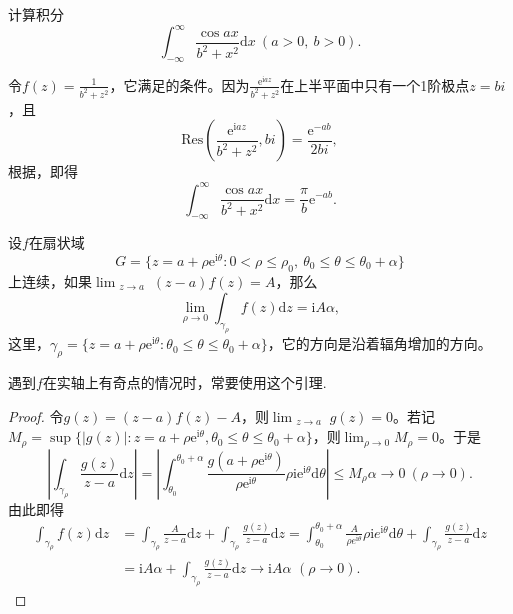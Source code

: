 \documentclass[../../main.tex]{subfiles}
\begin{document}
\begin{example}
计算积分
\[
\int_{-\infty}^{\infty} \frac{\cos ax}{b^2 + x^2} \mathrm{d}x \ (a > 0, \ b > 0).
\]
\end{example}
\begin{solution}
令\( f(z) = \frac{1}{b^2 + z^2} \)，它满足的条件。因为\( \frac{\mathrm{e}^{\mathrm{i}az}}{b^2 + z^2} \)在上半平面中只有一个1阶极点\( z = bi \)，且
\[
\mathrm{Res}\left( \frac{\mathrm{e}^{\mathrm{i}az}}{b^2 + z^2}, bi \right) = \frac{\mathrm{e}^{-ab}}{2bi},
\]
根据，即得
\[
\int_{-\infty}^{\infty} \frac{\cos ax}{b^2 + x^2} \mathrm{d}x = \frac{\pi}{b} \mathrm{e}^{-ab}.
\]

\end{solution}

\begin{lemma}\label{lemma:引理5.5.9}
设$f$在扇状域
\[
G = \{ z = a + \rho \mathrm{e}^{\mathrm{i}\theta} : 0 < \rho \leqslant \rho_0, \ \theta_0 \leqslant \theta \leqslant \theta_0 + \alpha \}
\]
上连续，如果\(\lim_{\substack{z \to a}} (z - a)f(z) = A\)，那么
\[
\lim_{\rho \to 0} \int_{\gamma_{\rho}} f(z) \mathrm{d}z = \mathrm{i}A\alpha, \label{lem5.5.9_eq}
\]
这里，\(\gamma_{\rho} = \{ z = a + \rho \mathrm{e}^{\mathrm{i}\theta} : \theta_0 \leqslant \theta \leqslant \theta_0 + \alpha \}\)，它的方向是沿着辐角增加的方向。
\end{lemma}
\begin{remark}
遇到$f$在实轴上有奇点的情况时，常要使用这个引理.
\end{remark}
\begin{proof}
令\( g(z) = (z - a)f(z) - A \)，则\(\lim_{\substack{z \to a}} g(z) = 0\)。若记\( M_{\rho} = \sup\{ |g(z)| : z = a + \rho \mathrm{e}^{\mathrm{i}\theta}, \theta_0 \leqslant \theta \leqslant \theta_0 + \alpha \} \)，则\(\lim_{\rho \to 0} M_{\rho} = 0\)。于是
\[
\left| \int_{\gamma_{\rho}} \frac{g(z)}{z - a} \mathrm{d}z \right| = \left| \int_{\theta_0}^{\theta_0 + \alpha} \frac{g(a + \rho \mathrm{e}^{\mathrm{i}\theta})}{\rho \mathrm{e}^{\mathrm{i}\theta}} \rho \mathrm{i}\mathrm{e}^{\mathrm{i}\theta} \mathrm{d}\theta \right|
\leqslant M_{\rho}\alpha
\to 0 \ (\rho \to 0).
\]
由此即得
\begin{align*}
\int_{\gamma _{\rho}}{f(z)\mathrm{d}z}&=\int_{\gamma _{\rho}}{\frac{A}{z-a}\mathrm{d}z}+\int_{\gamma _{\rho}}{\frac{g(z)}{z-a}\mathrm{d}z}=\int_{\theta _0}^{\theta _0+\alpha}{\frac{A}{\rho e^{\mathrm{i}\theta}}\rho \mathrm{i}e^{\mathrm{i}\theta}\mathrm{d}\theta}+\int_{\gamma _{\rho}}{\frac{g(z)}{z-a}\mathrm{d}z}
\\
&=\mathrm{i}A\alpha +\int_{\gamma _{\rho}}{\frac{g(z)}{z-a}\mathrm{d}z}\rightarrow \mathrm{i}A\alpha \,\,(\rho \rightarrow 0).
\end{align*}

\end{proof}
\end{document}
